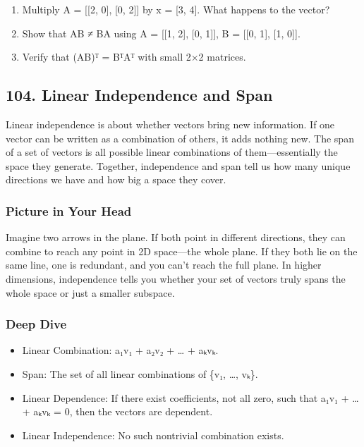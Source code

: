 \documentclass[
  letterpaper,
  DIV=11,
  numbers=noendperiod]{scrreprt}
\providecommand{\tightlist}{%
  \setlength{\itemsep}{0pt}\setlength{\parskip}{0pt}}
\begin{document}
\begin{enumerate}
\def\labelenumi{\arabic{enumi}.}
\tightlist
\item
  Multiply A = {[}{[}2, 0{]}, {[}0, 2{]}{]} by x = {[}3, 4{]}. What
  happens to the vector?
\item
  Show that AB ≠ BA using A = {[}{[}1, 2{]}, {[}0, 1{]}{]}, B = {[}{[}0,
  1{]}, {[}1, 0{]}{]}.
\item
  Verify that (AB)ᵀ = BᵀAᵀ with small 2×2 matrices.
\end{enumerate}

\subsection{104. Linear Independence and
Span}\label{linear-independence-and-span}

Linear independence is about whether vectors bring new information. If
one vector can be written as a combination of others, it adds nothing
new. The span of a set of vectors is all possible linear combinations of
them---essentially the space they generate. Together, independence and
span tell us how many unique directions we have and how big a space they
cover.

\subsubsection{Picture in Your Head}\label{picture-in-your-head-103}

Imagine two arrows in the plane. If both point in different directions,
they can combine to reach any point in 2D space---the whole plane. If
they both lie on the same line, one is redundant, and you can't reach
the full plane. In higher dimensions, independence tells you whether
your set of vectors truly spans the whole space or just a smaller
subspace.

\subsubsection{Deep Dive}\label{deep-dive-103}

\begin{itemize}
\tightlist
\item
  Linear Combination: a₁v₁ + a₂v₂ + \ldots{} + aₖvₖ.
\item
  Span: The set of all linear combinations of \{v₁, \ldots, vₖ\}.
\item
  Linear Dependence: If there exist coefficients, not all zero, such
  that a₁v₁ + \ldots{} + aₖvₖ = 0, then the vectors are dependent.
\item
  Linear Independence: No such nontrivial combination exists.
\end{itemize}
\end{document}
